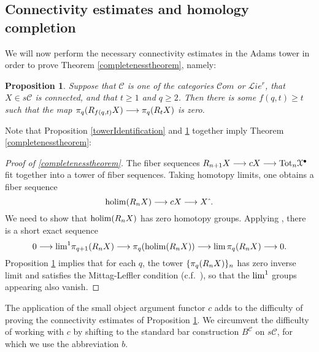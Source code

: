 \documentclass[11pt]{amsart} \renewcommand{\baselinestretch}{1.2}
\theoremstyle{plain}
\newtheorem{prop}[thm]{Proposition}
\theoremstyle{definition}
\DeclareMathOperator*{\holim}{holim}
\renewcommand{\to}{\longrightarrow}
\newcommand{\scrL}{\mathscr{L}}
\newcommand{\scrC}{\mathscr{C}}
\newcommand{\calx}{\mathcal{X}}
\newcommand{\calc}{\mathcal{C}}
\newcommand{\citeBOX}[2][]{\cite[\mbox{#1}]{#2}}
\newcommand{\algs}{{\scrC\!\textit{om}}}
\newcommand{\restliealgs}{{\scrL\!\textit{ie}^\textit{r}}}
\newcommand{\algcat}{{\calc}}%
\newcommand{\dupdown}[2]{R_{\smash{#1}}}
\newcommand{\algCat}{\calc}
\newcommand{\barConstructionMightAbbreviate}{b}
\begin{document}
\begin{Bousfield-Kan spectral sequence}
\subsection{Connectivity estimates and homology completion}
\label{sec:connectivityAnalysis}
We will now perform the necessary connectivity estimates in the Adams tower in order to prove Theorem \ref{completenesstheorem}, namely:  
%
\begin{prop}
\label{convergenceProp}
Suppose that $\algcat$ is one of the categories $\algs$ or $\restliealgs$, that $X\in s\algcat$ is connected, and that  $t\geq1$ and $q\geq2$. Then there is some $f(q,t)\geq t$ such that the map $\pi_q(\dupdown{f(q,t)}{c}X)\to\pi_q(\dupdown{t}{c}X)$ is zero.
\end{prop}
\noindent Note that Proposition \ref{towerIdentification} and \ref{convergenceProp} together imply Theorem \ref{completenesstheorem}:
\begin{proof}[Proof of \ref{completenesstheorem}]
The fiber sequences $\dupdown{n+1}{c}X\to cX\to \textup{Tot}_n\calx^\bullet$ fit together into a tower of fiber sequences. Taking homotopy limits, one obtains a fiber sequence
\[\holim (\dupdown{n}{c}X)\to cX\to X\hat{\ }.\]
We need to show that $\holim (\dupdown{n}{c}X)$ has zero homotopy groups.
Applying \cite[Proposition 6.14]{goerss-jardine.pdf}, there is a short exact sequence
\[0\to \textup{lim}^1\pi_{q+1}(\dupdown{n}{c}X)\to \pi_q(\holim (\dupdown{n}{c}X))\to \textup{lim}\,\pi_{q}(\dupdown{n}{c}X)\to 0.\]
Proposition \ref{convergenceProp} implies that for each $q$, the tower $\{\pi_{q}(\dupdown{n}{c}X)\}_n$ has zero inverse limit and satisfies the Mittag-Leffler condition (c.f.\ \citeBOX[p.~264]{YellowMonster}), so that the $\textup{lim}^1$ groups appearing also vanish.
\end{proof}
The application of the small object argument functor $c$ adds to the difficulty of proving the connectivity estimates of Proposition \ref{convergenceProp}. We circumvent the difficulty of working with $c$ by shifting to the standard bar construction $B^{\algCat}$ on $s\algCat$, for which we use the abbreviation $\barConstructionMightAbbreviate $.


\end{Bousfield-Kan spectral sequence}
\end{document}
